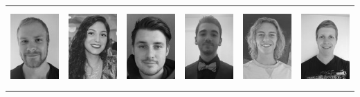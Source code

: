   \begin{titlingpage}
        \maketitle %
        \begin{adjustbox}{center}
                \begin{tabular}{llllll}
                     \includegraphics[height=3cm]{fig/gruppeBilleder/mfager.png} &  \includegraphics[height=3cm]{fig/gruppeBilleder/milishia.png} &
                     \includegraphics[height=3cm]{fig/gruppeBilleder/nicki.png} &
                     \includegraphics[height=3cm]{fig/gruppeBilleder/semi.png} &
                     \includegraphics[height=3cm]{fig/gruppeBilleder/simon.png} &
                     \includegraphics[height=3cm]{fig/gruppeBilleder/thyge.png}

\end{tabular}
\end{adjustbox}
\end{titlingpage}
